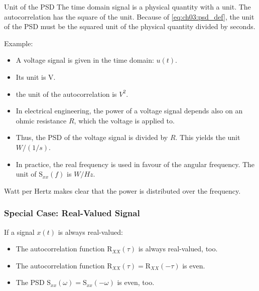 \begin{refsection}
\begin{excursus}{Unit of the \ac{PSD}}
	The time domain signal is a physical quantity with a unit. The autocorrelation has the square of the unit. Because of \eqref{eq:ch03:psd_def}, the unit of the \ac{PSD} must be the squared unit of the physical quantity divided by seconds.
	
	Example:
	\begin{itemize}
		\item A voltage signal is given in the time domain: $u(t)$.
		\item Its unit is \si{V}.
		\item the unit of the autocorrelation is $\si{V^2}$.
		\item In electrical engineering, the power of a voltage signal depends also on an ohmic resistance $R$, which the voltage is applied to.
		\item Thus, the \ac{PSD} of the voltage signal is divided by $R$. This yields the unit $\si{W/(1/s)}$.
		\item In practice, the real frequency is used in favour of the angular frequency. The unit of $\mathrm{S}_{xx}(f)$ is $\si{W/Hz}$.
	\end{itemize}
	Watt per Hertz makes clear that the power is distributed over the frequency.
\end{excursus}

\subsubsection{Special Case: Real-Valued Signal}

If a signal $x(t)$ is always real-valued:
\begin{itemize}
	\item The autocorrelation function $\mathrm{R}_{XX}(\tau)$ is always real-valued, too.
	\item The autocorrelation function $\mathrm{R}_{XX}(\tau) = \mathrm{R}_{XX}(-\tau)$ is even.
	\item The \ac{PSD} $\mathrm{S}_{xx}(\omega) = \mathrm{S}_{xx}(- \omega)$ is even, too.
\end{itemize}



\end{refsection}
